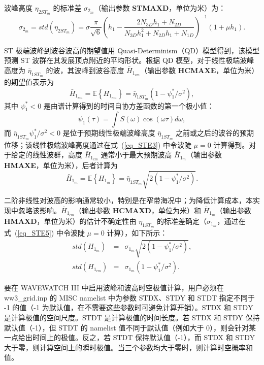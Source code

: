 波峰高度 $\eta_{2ST_m}$ 的标准差 $\sigma_{2_m}$（输出参数 \textbf{STMAXD}，单位为米）为：
\begin{equation}
\sigma_{2_m}=std(\eta_{2ST_m})=\sigma \frac{\pi}{\sqrt{6}} \left( h_1-\frac{2N_{3D}h_1+N_{2D}}{N_{3D} h_1^{2}+N_{2D} h_1+N_{1D}}\right)^{-1} (1+\mu h_1) .
\label{eq_STE5}
\end{equation}

ST 极端波峰到波谷波高的期望值用 Quasi-Determinism（QD）模型得到，该模型预测 ST 波群在其发展顶点附近的平均形状。根据 QD 模型，对于线性极端波峰高度为 $\bar{\eta}_{1ST_m}$ 的波，其波峰到波谷高度 $\bar{H}_{1_{cm}}$（输出参数 \textbf{HCMAXE}，单位为米）的期望值表示为
\begin{equation}
\bar{H}_{1_{cm}}=\mathbb{E}\left\{H_{1_{cm}} \right\} = \bar{\eta}_{1ST_m}(1-\psi_1^* / \sigma^2),
\label{eq_STE6}
\end{equation}
其中 $\psi_1^* < 0$ 是由谱计算得到的时间自协方差函数的第一个极小值：
\begin{equation}
\psi_1(\tau) = \int S(\omega) \cos{(\omega \tau)} d \omega,
\label{eq_STE7}
\end{equation}
而 $\bar{\eta}_{1ST_m}  \psi_1^*/\sigma^2 < 0$ 是位于预期线性极端波峰高度 $\bar{\eta}_{1ST_m}$ 之前或之后的波谷的预期位移；该线性极端波峰高度通过在式~(\ref{eq_STE3}) 中令波陡 $\mu=0$ 计算得到。对于给定的线性波群，高度 $\bar{H}_{1_{cm}}$ 通常小于最大预期波高 $\bar{H}_{1_m}$（输出参数 \textbf{HMAXE}，单位为米），后者计算为
\begin{equation}
\bar{H}_{1_m}=\mathbb{E}\left\{H_{1_m} \right\} = \bar{\eta}_{1ST_m}\sqrt{2(1-\psi_1^* / \sigma^2)}.
\label{eq_STE8}
\end{equation}

二阶非线性对波高的影响通常较小，特别是在窄带海况中；为降低计算成本，本实现中忽略该影响。$\bar{H}_{1_{cm}}$（输出参数 \textbf{HCMAXD}，单位为米）和 $\bar{H}_{1_m}$（输出参数 \textbf{HMAXD}，单位为米）的估计不确定性由 $\eta_{1ST_m}$ 的标准差确定（$\sigma_{1_m}$，通过在式~(\ref{eq_STE5}) 中令波陡 $\mu=0$ 计算），如下所示：
\begin{eqnarray}
std({H}_{1_m})&=&\sigma_{1_m}\sqrt{2(1-\psi_1^* / \sigma^2)}, \nonumber \\
std({H}_{1_{cm}})&=&\sigma_{1_m}(1-\psi_1^* / \sigma^2).
\label{eq_STE9}
\end{eqnarray}

要在 WAVEWATCH III 中启用波峰和波高时空极值计算，用户必须在 {\file ww3\_grid.inp} 的 {\F MISC} namelist 中为参数 {\code STDX}、{\code STDY} 和 {\code STDT} 指定不同于 -1 的值（-1 为默认值，在不需要这些参数时可避免计算开销）。{\code STDX} 和 {\code STDY} 是计算极值的空间尺度。{\code STDT} 是计算极值的时间长度。若 {\code STDX} 和 {\code STDY} 保持默认值（-1），但 {\code STDT} 的 namelist 值不同于默认值（例如大于 0），则会针对某一点给出时间上的极值。反之，若 {\code STDT} 保持默认值（-1），而 {\code STDX} 和 {\code STDY} 大于零，则计算空间上的瞬时极值。当三个参数均大于零时，则计算时空概率和值。

